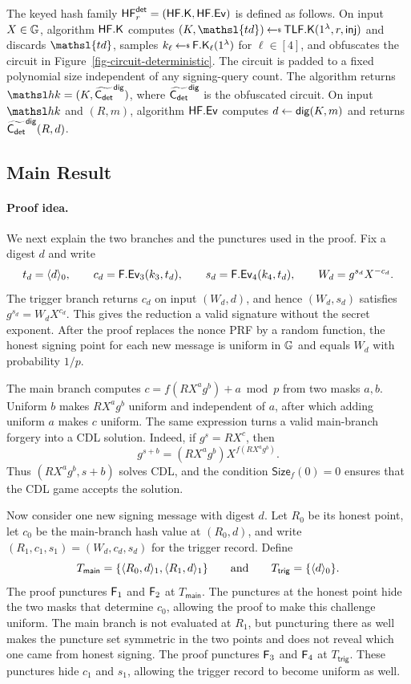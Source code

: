 \begin{construction} \label{constr-dio}
The keyed hash family $\mathsf{HF}^{\mathsf{det}}_r=(\mathsf{HF}.\mathsf{K},\mathsf{HF}.\mathsf{Ev})$ is defined as follows. On input $X\in\mathbb{G}$, algorithm $\mathsf{HF}.\mathsf{K}$ computes $(K,\mathsl{td})\getsr\TLFKg(\usecp,r,\mathsf{inj})$ and discards $\mathsl{td}$, samples $k_\ell\getsr\PRFKg_\ell(\usecp)$ for $\ell\in[4]$, and obfuscates the circuit in Figure~\ref{fig-circuit-deterministic}. The circuit is padded to a fixed polynomial size independent of any signing-query count. The algorithm returns $\hk=(K,\widetilde{\CircDet}^{\mathsf{dig}})$, where $\widetilde{\mathsf{C}_{\mathsf{det}}}^{\mathsf{dig}}$ is the obfuscated circuit. On input $\hk$ and $(R,m)$, algorithm $\mathsf{HF}.\mathsf{Ev}$ computes $d\gets\mathsf{dig}(K,m)$ and returns $\widetilde{\mathsf{C}_{\mathsf{det}}}^{\mathsf{dig}}(R,d)$.
\end{construction}

\subsection{Main Result} \label{sec-derand-adaptive}

\paragraph*{Proof idea.} We next explain the two branches and the punctures used in the proof. Fix a digest $d$ and write
$$
t_d=\langle d \rangle_0,
\qquad
c_d=\mathsf{F}.\mathsf{Ev}_3(k_3,t_d),
\qquad
s_d=\mathsf{F}.\mathsf{Ev}_4(k_4,t_d),
\qquad
W_d=g^{s_d}X^{-c_d}.
$$
The trigger branch returns $c_d$ on input $(W_d,d)$, and hence $(W_d,s_d)$ satisfies $g^{s_d}=W_dX^{c_d}$. This gives the reduction a valid signature without the secret exponent. After the proof replaces the nonce PRF by a random function, the honest signing point for each new message is uniform in $\mathbb{G}$ and equals $W_d$ with probability $1/p$.

The main branch computes $c=f(RX^ag^b)+a\bmod p$ from two masks $a,b$. Uniform $b$ makes $RX^ag^b$ uniform and independent of $a$, after which adding uniform $a$ makes $c$ uniform. The same expression turns a valid main-branch forgery into a CDL solution. Indeed, if $g^s=RX^c$, then
$$
g^{s+b}=(RX^ag^b)X^{f(RX^ag^b)}.
$$
Thus $(RX^ag^b,s+b)$ solves CDL, and the condition $\mathsf{Size}_f(0)=0$ ensures that the CDL game accepts the solution.

Now consider one new signing message with digest $d$. Let $R_0$ be its honest point, let $c_0$ be the main-branch hash value at $(R_0,d)$, and write $(R_1,c_1,s_1)=(W_d,c_d,s_d)$ for the trigger record. Define
$$
T_{\mathsf{main}}=\{\langle R_0,d \rangle_1,\langle R_1,d \rangle_1\}
\qquad\text{and}\qquad
T_{\mathsf{trig}}=\{\langle d \rangle_0\}.
$$
The proof punctures $\mathsf{F}_1$ and $\mathsf{F}_2$ at $T_{\mathsf{main}}$. The punctures at the honest point hide the two masks that determine $c_0$, allowing the proof to make this challenge uniform. The main branch is not evaluated at $R_1$, but puncturing there as well makes the puncture set symmetric in the two points and does not reveal which one came from honest signing. The proof punctures $\mathsf{F}_3$ and $\mathsf{F}_4$ at $T_{\mathsf{trig}}$. These punctures hide $c_1$ and $s_1$, allowing the trigger record to become uniform as well.

